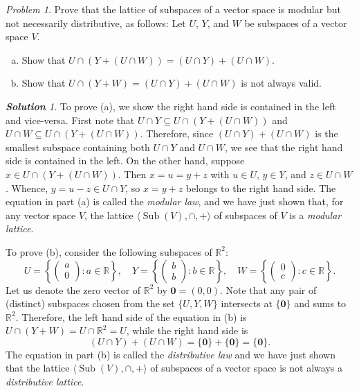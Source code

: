 \documentclass[11pt]{paper}
\theoremstyle{remark}
\newtheorem{problem}{Problem}
\newtheorem*{solution}{{\bf Solution}}
\newcommand\0{\ensuremath{\mathbf{0}}}
\newcommand{\<}{\ensuremath{\langle}}
\renewcommand{\>}{\ensuremath{\rangle}}
\newcommand\fld[1]{\ensuremath{\mathbb{#1}}}
\newcommand\R{\ensuremath{\fld{R}}}
\newcommand{\Sub}{\ensuremath{\operatorname{Sub}}}
\begin{document}
\probskip

\begin{problem} %
Prove that the lattice of subspaces of a vector space
is modular but not necessarily distributive, as follows:
Let $U$, $Y$, and $W$ be subspaces of a vector space $V$. 
\begin{enumerate}[(a)]
\item Show that $U\cap (Y + (U \cap W)) = (U \cap Y) + (U \cap W)$.
\item Show that $U \cap (Y + W) = (U \cap Y) + (U \cap W)$ is not always valid.
\end{enumerate}
\end{problem}
\begin{solution}
To prove (a), we show the right hand side is contained in the left and
vice-versa.
First note that
$U \cap Y \subseteq U\cap (Y + (U \cap W))$ and 
$U \cap W \subseteq U\cap (Y + (U \cap W))$.
Therefore, since $(U \cap Y) + (U \cap W)$ is the smallest subspace containing both 
$U \cap Y$ and $U \cap W$, we see that the right hand side is contained in the left.
On the other hand, suppose $x \in U\cap (Y + (U \cap W))$.
Then $x = u = y + z$ with $u \in U$, $y\in Y$, and $z\in U \cap W$.
Whence, $y = u-z \in U \cap Y$, so $x = y+z$ belongs to the right hand side.
The equation in part (a) is called the \emph{modular law}, and we have
just shown that, for any vector space $V$, the lattice 
$\<\Sub(V), \cap, +\>$ of subspaces of
$V$ is a \emph{modular lattice}.

To prove (b), consider the following subspaces of $\R^2$:
\[
U = \left\{
\begin{pmatrix} a\\ 0 \end{pmatrix} : a\in \R \right\}, \quad 
Y = \left\{
\begin{pmatrix} b\\ b \end{pmatrix} : b\in \R \right\}, \quad 
W = \left\{
\begin{pmatrix} 0\\ c \end{pmatrix} : c\in \R \right\}.
\]
Let us denote the zero vector of $\R^2$ by 
$\0 = (0, 0)$.
Note that any pair of (distinct) subspaces chosen from the set
$\{U, Y, W\}$ intersects at $\{\0\}$ and sums to $\R^2$.
Therefore, the left hand side of the equation in (b) is
$U \cap (Y + W) = U \cap \R^2 = U$, while the right hand side is 
\[
(U\cap Y) + (U\cap W) = \{\0\} + \{\0\}
= \{\0\}.
\]
The equation in part (b) is called the \emph{distributive law} and we have just shown
that the lattice $\<\Sub(V), \cap, +\>$ of subspaces of a vector space is not
always a \emph{distributive lattice}.

\end{solution}
\end{document}

